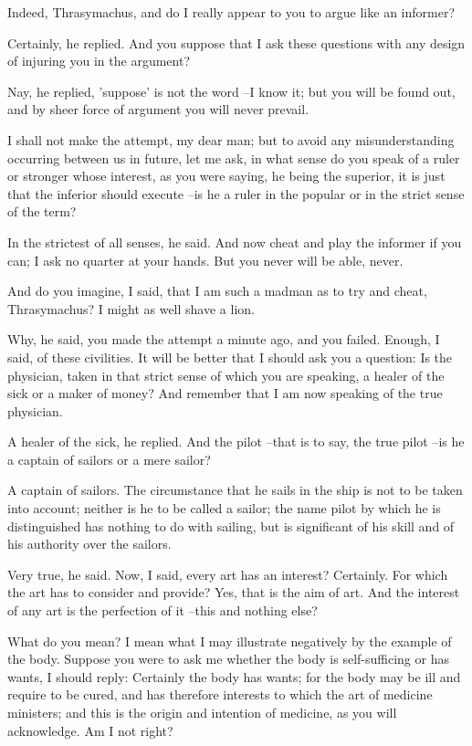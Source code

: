 Indeed, Thrasymachus, and do I really appear to you to argue like an informer?

Certainly, he replied.
And you suppose that I ask these questions with any design of injuring you in the argument?

Nay, he replied, 'suppose' is not the word --I know it; but you will be found out, and by sheer force of argument you will never prevail.

I shall not make the attempt, my dear man; but to avoid any misunderstanding occurring between us in future, let me ask, in what sense do you speak of a ruler or stronger whose interest, as you were saying, he being the superior, it is just that the inferior should execute --is he a ruler in the popular or in the strict sense of the term?

In the strictest of all senses, he said. And now cheat and play the informer if you can; I ask no quarter at your hands. But you never will be able, never.

And do you imagine, I said, that I am such a madman as to try and cheat, Thrasymachus? I might as well shave a lion.

Why, he said, you made the attempt a minute ago, and you failed.
Enough, I said, of these civilities. It will be better that I should ask you a question: Is the physician, taken in that strict sense of which you are speaking, a healer of the sick or a maker of money? And remember that I am now speaking of the true physician.

A healer of the sick, he replied.
And the pilot --that is to say, the true pilot --is he a captain of sailors or a mere sailor?

A captain of sailors.
The circumstance that he sails in the ship is not to be taken into account; neither is he to be called a sailor; the name pilot by which he is distinguished has nothing to do with sailing, but is significant of his skill and of his authority over the sailors.

Very true, he said.
Now, I said, every art has an interest?
Certainly.
For which the art has to consider and provide?
Yes, that is the aim of art.
And the interest of any art is the perfection of it --this and nothing else?

What do you mean?
I mean what I may illustrate negatively by the example of the body. Suppose you were to ask me whether the body is self-sufficing or has wants, I should reply: Certainly the body has wants; for the body may be ill and require to be cured, and has therefore interests to which the art of medicine ministers; and this is the origin and intention of medicine, as you will acknowledge. Am I not right?

